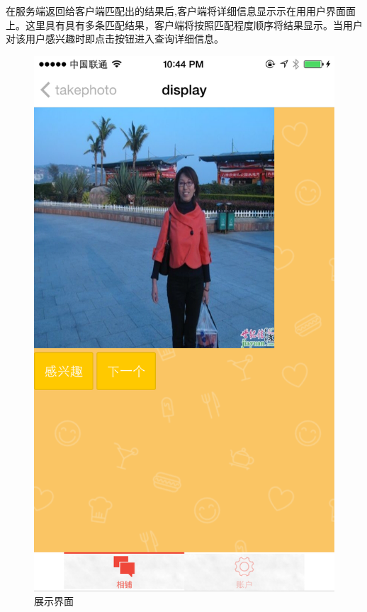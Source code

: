 在服务端返回给客户端匹配出的结果后,客户端将详细信息显⽰示在⽤用户界⾯面上。这里具有具有多条匹配结果，客户端将按照匹配程度顺序将结果显⽰。当用户对该用户感兴趣时即点击按钮进入查询详细信息。

\begin{figure}[h] 
\begin{minipage}[t]{0.45\linewidth}
\centering
\includegraphics[width=\textwidth]{img/chap4/display.PNG}
\caption{展示界面\label{instagram}}
\end{minipage}


\end{figure}



